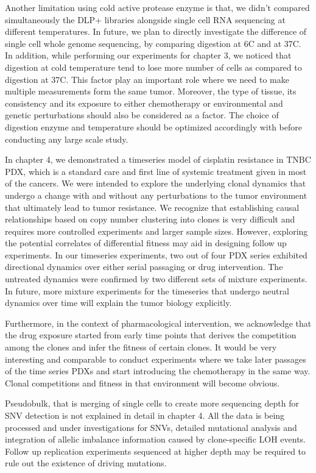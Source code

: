Another limitation using cold active protease enzyme is that, we didn't compared simultaneously the \ac{DLP+} libraries alongside single cell RNA sequencing at different temperatures. In future, we plan to directly investigate the difference of single cell whole genome sequencing, by comparing digestion at 6\textdegree C and at 37\textdegree C. In addition, while performing our experiments for chapter 3, we noticed that digestion at cold temperature tend to lose more number of cells as compared to digestion at 37\textdegree C. This factor play an important role where we need to make multiple measurements form the same tumor. Moreover, the type of tissue, its consistency and its exposure to either chemotherapy or environmental and genetic perturbations should also be considered as a factor. The choice of digestion enzyme and temperature should be optimized accordingly with before conducting any large scale study.

In chapter 4, we demonstrated a timeseries model of cisplatin resistance in TNBC PDX, which is a standard care and first line of systemic treatment given in most of the cancers. We were intended to explore the underlying clonal dynamics that undergo a change with and without any perturbations to the tumor environment that ultimately lead to tumor resistance. We recognize that establishing causal relationships based on copy number clustering into clones is very difficult and requires more controlled experiments and larger sample sizes. However, exploring the potential correlates of differential fitness may aid in designing follow up experiments. In our timeseries experiments, two out of four PDX series exhibited directional dynamics over either serial passaging or drug intervention. The untreated dynamics were confirmed by two different sets of mixture experiments. In future, more mixture experiments for the timeseries that undergo neutral dynamics over time will explain the tumor biology explicitly. 

Furthermore, in the context of pharmacological intervention, we acknowledge that the drug exposure started from early time points that derives the competition among the clones and infer the fitness of certain clones. It would be very interesting and comparable to conduct experiments where we take later passages of the time series PDXs and start introducing the chemotherapy in the same way. Clonal competitions and fitness in that environment will become obvious.

Pseudobulk, that is merging of single cells to create more sequencing depth for SNV detection is not explained in detail in chapter 4. All the data is being processed and under investigations for SNVs, detailed mutational analysis and integration of allelic imbalance information caused by clone-specific \ac{LOH} events. Follow up replication experiments sequenced at higher depth may be required to rule out the existence of driving mutations. 


